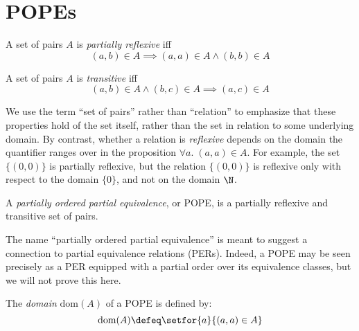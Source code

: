 \documentclass{article}
\newcommand{\dom}[1]{\text{dom}(#1)}
\begin{document}


\section{POPEs}

\begin{definition}
  A set of pairs $A$ is \emph{partially reflexive} iff
  \[ (a,b) \in A \implies (a,a) \in A \wedge (b,b) \in A \]
\end{definition}

\begin{definition}
  A set of pairs $A$ is \emph{transitive} iff
  \[ (a,b) \in A \wedge (b,c) \in A \implies (a,c) \in A\]
\end{definition}

We use the term ``set of pairs'' rather than ``relation'' to emphasize that
these properties hold of the set itself, rather than the set in relation to some
underlying domain. By contrast, whether a relation is \emph{reflexive} depends
on the domain the quantifier ranges over in the proposition $\forall a.\; (a,a)
\in A$. For example, the set $\{(0,0)\}$ is partially reflexive, but the
relation $\{(0,0)\}$ is reflexive only with respect to the domain $\{0\}$, and
not on the domain $\N$.

\begin{definition}
  A \emph{partially ordered partial equivalence}, or POPE, is a partially
  reflexive and transitive set of pairs.
\end{definition}

The name ``partially ordered partial equivalence'' is meant to suggest a
connection to partial equivalence relations (PERs). Indeed, a POPE may be seen
precisely as a PER equipped with a partial order over its equivalence classes,
but we will not prove this here.

\begin{definition}
  The \emph{domain} $\dom{A}$ of a POPE is defined by:
  \begin{equation*}
    \dom{A} \defeq \setfor{a}{(a,a) \in A}
  \end{equation*}
\end{definition}
\end{document}
